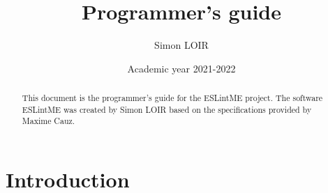 \documentclass[12pt]{article}
\title{Programmer's guide}
\author{Simon LOIR}
\date{Academic year 2021-2022}
\begin{document}
\begin{titlepage}
\maketitle
\begin{abstract}
\noindent    
This document is the programmer's guide for the ESLintME project. 
The software ESLintME was created by Simon LOIR based on the specifications provided by Maxime Cauz.
\end{abstract}
\end{titlepage}

\section{Introduction}





\end{document}
